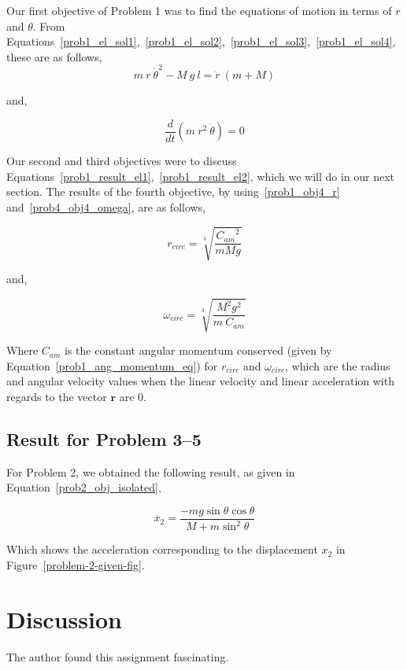 \documentclass[conference]{IEEEtran}
\begin{document}
Our first objective of Problem 1 was to find the equations of motion in terms
of $r$ and $\theta$. From Equations~\ref{prob1_el_sol1},~\ref{prob1_el_sol2},~\ref{prob1_el_sol3},~\ref{prob1_el_sol4}, these are as follows,\\

\begin{equation}\label{prob1_result_el1}
    \boxed{
        m~r~\dot{\theta}^2 - M~g~l = \ddot{r}~(m + M)
    }
\end{equation}

and,

\begin{equation}\label{prob1_result_el2}
    \boxed{
        \frac{d}{dt}\left( m~r^2~\dot{\theta} \right) = 0
    }
\end{equation}

Our second and third objectives were to discuss Equations~\ref{prob1_result_el1},~\ref{prob1_result_el2},
which we will do in our next section. The results of the fourth objective, by using~\ref{prob1_obj4_r}
and~\ref{prob4_obj4_omega}, are as follows,

\begin{equation}
    \boxed{r_{circ} = \sqrt[3]{\frac{{C_{am}}^2}{mMg}}}
\end{equation}

and,

\begin{equation}
    \boxed{\omega_{circ} = \sqrt[3]{\frac{M^2g^2}{m~C_{am}}}}
\end{equation}

Where $C_{am}$ is the constant angular momentum conserved (given by Equation~\ref{prob1_ang_momentum_eq}) for $r_{circ}$ and $\omega_{circ}$,
which are the radius and angular velocity values when the linear velocity and linear acceleration with
regards to the vector $\textbf{r}$ are 0.

\subsection{Result for Problem 3--5}

For Problem 2, we obtained the following result, as given in Equation~\ref{prob2_obj_isolated},

\[
    \boxed{
        \ddot{x_2} = \frac{-mg\sin\theta\cos\theta}{M + m \sin^2\theta}     
    }
\]

Which shows the acceleration corresponding to the displacement $x_2$ in Figure~\ref{problem-2-given-fig}.

\section{Discussion}

The author found this assignment fascinating.



\end{document}
